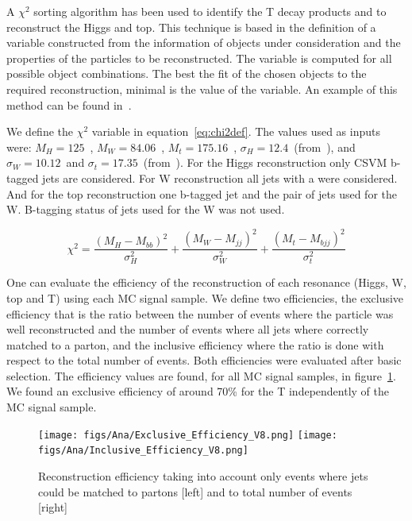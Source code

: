 A $\chi^{2}$ sorting algorithm has been used to identify the T decay products and to reconstruct the Higgs and top. This technique is based in the definition of a variable constructed from the information of objects under consideration and the properties of the particles to be reconstructed. The variable is computed for all possible object combinations. The best the fit of the chosen objects to the required reconstruction, minimal is the value of the variable. An example of this method can be found in~\cite{Brochet:1956723}. 

We define the $\chi^{2}$ variable in equation~\ref{eq:chi2def}. The values used as inputs were: $M_{H}=125$~\GeVcc, $M_{W}=84.06$~\GeVcc, $M_{t}=175.16$~\GeVcc, $\sigma_{H}=12.4$~\GeVcc (from~\cite{Chatrchyan:2013zna}), and $\sigma_{W}=10.12$~\GeVcc and $\sigma_{t}=17.35$~\GeVcc (from~\cite{Brochet:1956723}). For the Higgs reconstruction only CSVM b-tagged jets are considered. For W reconstruction all jets with a  were considered. And for the top reconstruction one b-tagged jet and the pair of jets used for the W. B-tagging status of jets used for the W was not used.

\begin{equation}
\chi^{2}=\frac{(M_{H}-M_{bb})^{2}}{\sigma_{H}^{2}}+\frac{(M_{W}-M_{jj})^{2}}{\sigma_{W}^{2}}+\frac{(M_{t}-M_{bjj})^{2}}{\sigma_{t}^{2}}
\label{eq:chi2def}
\end{equation}

One can evaluate the efficiency of the reconstruction of each resonance (Higgs, W, top and T) using each MC signal sample. We define two efficiencies, the exclusive efficiency that is the ratio between the number of events where the particle was well reconstructed and the number of events where all jets where correctly matched to a parton, and the inclusive efficiency where the ratio is done with respect to the total number of events. Both efficiencies were evaluated after basic selection. The efficiency values are found, for all MC signal samples, in figure~\ref{fig:RecEff}. We found an exclusive efficiency of around 70\% for the T independently of the MC signal sample.

\begin{figure}[!Hhtbp]
  \begin{center}
    \texttt{[image: figs/Ana/Exclusive\_Efficiency\_V8.png]}
    \texttt{[image: figs/Ana/Inclusive\_Efficiency\_V8.png]}
    \caption{Reconstruction efficiency taking into account only events where jets could be matched to partons [left] and to total number of events [right]}
    \label{fig:RecEff}
  \end{center}
\end{figure}

